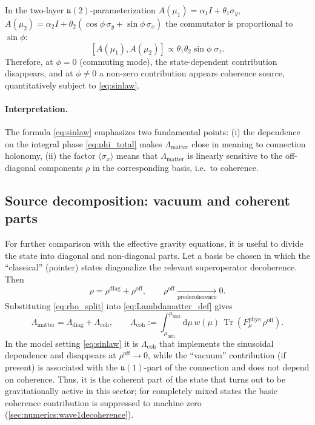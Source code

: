 \documentclass[11pt,a4paper]{article}
\DeclareMathOperator{\Tr}{Tr}
\newcommand{\dd}{\mathrm{d}}
\theoremstyle{definition}
\theoremstyle{plain}
\theoremstyle{remark}
\begin{document}
In the two-layer $\mathfrak u(2)$-parameterization
$A(\mu_1)=\alpha_1I+\theta_1\sigma_y$,
$A(\mu_2)=\alpha_2I+\theta_2(\cos\phi\,\sigma_y+\sin\phi\,\sigma_x)$
the commutator is proportional to $\sin\phi$:
\[
[A(\mu_1),A(\mu_2)] \propto \theta_1\theta_2\sin\phi\;\sigma_z.
\]
Therefore, at $\phi=0$ (commuting mode), the state-dependent contribution disappears, and at $\phi\neq 0$
a non-zero contribution appears coherence source, quantitatively subject to \eqref{eq:sinlaw}.

\paragraph{Interpretation.}
The formula \eqref{eq:sinlaw} emphasizes two fundamental points:
(i) the dependence on the integral phase \eqref{eq:phi_total} makes $\Lambda_{\mathrm{matter}}$ close in meaning to connection holonomy,
(ii) the factor $\langle\sigma_x\rangle$ means that $\Lambda_{\mathrm{matter}}$ is linearly sensitive to the off-diagonal components
$\rho$ in the corresponding basis, i.e.\ to coherence.

\subsection{Source decomposition: vacuum and coherent parts}
\label{sec:theory:split}

For further comparison with the effective gravity equations, it is useful to divide the state into diagonal and non-diagonal parts.
Let a basis be chosen in which the “classical” (pointer) states diagonalize the relevant superoperator decoherence.
Then
\begin{equation}\label{eq:rho_split}
\rho = \rho^{\mathrm{diag}} + \rho^{\mathrm{off}},
\qquad
\rho^{\mathrm{off}}\xrightarrow[\text{predecoherence}]{} 0.
\end{equation}
Substituting \eqref{eq:rho_split} into \eqref{eq:Lambdamatter_def} gives
\begin{equation}\label{eq:Lambda_split}
\Lambda_{\mathrm{matter}} = \Lambda_{\mathrm{diag}} + \Lambda_{\mathrm{coh}},
\qquad
\Lambda_{\mathrm{coh}}
:=
\int_{\mu_{\min}}^{\mu_{\max}}\dd\mu\, w(\mu)\,\Tr\!\left(F_{\mu}^{\mathrm{phys}}\,\rho^{\mathrm{off}}\right).
\end{equation}
In the model setting \eqref{eq:sinlaw} it is $\Lambda_{\mathrm{coh}}$ that implements the sinusoidal dependence and disappears at $\rho^{\mathrm{off}}\to 0$,
while the “vacuum” contribution (if present) is associated with the $\mathfrak{u}(1)$-part of the connection and does not depend on coherence.
Thus, it is the coherent part of the state that turns out to be gravitationally active in this sector;
for completely mixed states the basic coherence contribution is suppressed to machine zero
(\cref{sec:numerics:wave1decoherence}).
\end{document}
